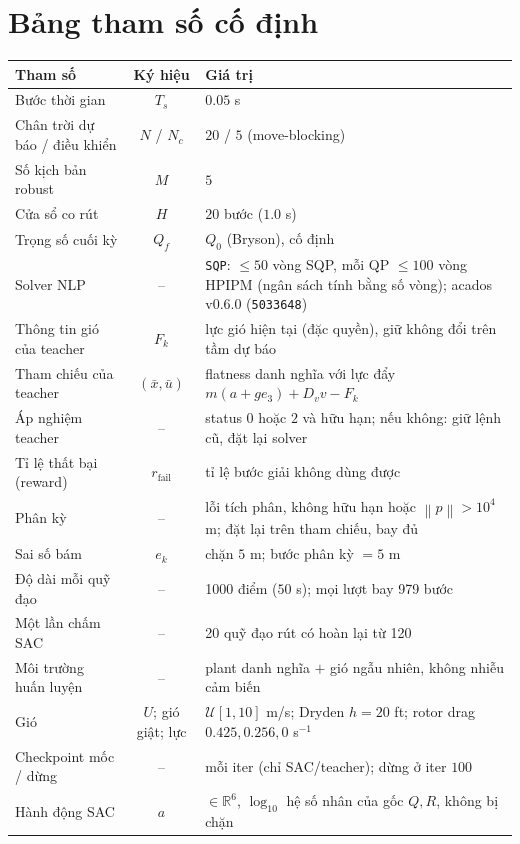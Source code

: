 \documentclass[11pt]{article}
\newcommand{\norm}[1]{\left\lVert #1 \right\rVert}
\begin{document}
\section{Bảng tham số cố định}
\begin{center}\small
\begin{tabular}{@{}p{5.2cm} c p{6.5cm}@{}}
\toprule
\textbf{Tham số} & \textbf{Ký hiệu} & \textbf{Giá trị}\\
\midrule
Bước thời gian & $T_s$ & $0.05$ s\\
Chân trời dự báo / điều khiển & $N$ / $N_c$ & $20$ / $5$ (move-blocking)\\
Số kịch bản robust & $M$ & $5$\\
Cửa sổ co rút & $H$ & $20$ bước ($1.0$ s)\\
Trọng số cuối kỳ & $Q_f$ & $Q_0$ (Bryson), cố định\\
Solver NLP & -- & \texttt{SQP}: $\le50$ vòng SQP, mỗi QP $\le100$ vòng HPIPM (ngân sách tính bằng số vòng); acados v0.6.0 (\texttt{5033648})\\
Thông tin gió của teacher & $F_k$ & lực gió hiện tại (đặc quyền), giữ không đổi trên tầm dự báo\\
Tham chiếu của teacher & $(\bar x,\bar u)$ & flatness danh nghĩa với lực đẩy $m(a+ge_3)+D_vv-F_k$\\
Áp nghiệm teacher & -- & status $0$ hoặc $2$ và hữu hạn; nếu không: giữ lệnh cũ, đặt lại solver\\
Tỉ lệ thất bại (reward) & $r_{\mathrm{fail}}$ & tỉ lệ bước giải không dùng được\\
Phân kỳ & -- & lỗi tích phân, không hữu hạn hoặc $\norm{p}>10^4$ m; đặt lại trên tham chiếu, bay đủ\\
Sai số bám & $e_k$ & chặn $5$ m; bước phân kỳ $=5$ m\\
Độ dài mỗi quỹ đạo & -- & 1000 điểm ($50$ s); mọi lượt bay 979 bước\\
Một lần chấm SAC & -- & 20 quỹ đạo rút có hoàn lại từ 120\\
Môi trường huấn luyện & -- & plant danh nghĩa $+$ gió ngẫu nhiên, không nhiễu cảm biến\\
Gió & $U$; gió giật; lực & $\mathcal U[1,10]$ m/s; Dryden $h=20$ ft; rotor drag $0.425,0.256,0$ s$^{-1}$\\
Checkpoint mốc / dừng & -- & mỗi iter (chỉ SAC/teacher); dừng ở iter $100$\\
Hành động SAC & $a$ & $\in\mathbb R^6$, $\log_{10}$ hệ số nhân của gốc $Q,R$, không bị chặn\\

\end{tabular}
\end{center}
\end{document}

